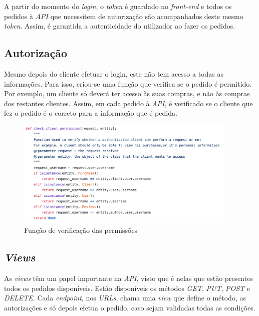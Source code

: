 \documentclass[10pt,english]{article}
\begin{document}
\par A partir do momento do \textit{login}, o \textit{token} é guardado no \textit{front-end} e todos os pedidos à \textit{API} que necessitem de autorização são acompanhados deste mesmo \textit{token}. Assim, é garantida a autenticidade do utilizador ao fazer os pedidos.

\subsection{Autorização}

\par Mesmo depois do cliente efetuar o login, este não tem acesso a todas as informações. Para isso, criou-se uma função que verifica se o pedido é permitido. Por exemplo, um cliente só deverá ter acesso às suas compras, e não às compras dos restantes clientes. Assim, em cada pedido à \textit{API}, é verificado se o cliente que fez o pedido é o correto para a informação que é pedida. 

\begin{figure}[!h]
        \centering
        \includegraphics[width=400]{images/clientverif.png}
        \caption{Função de verificação das permissões}
\end{figure}

\newpage

\subsection{\textit{Views}}

\par As \textit{views} têm um papel importante na \textit{API}, visto que é nelas que estão presentes todos os pedidos disponíveis. Estão disponíveis os métodos \textit{GET}, \textit{PUT}, \textit{POST} e \textit{DELETE}. Cada \textit{endpoint}, nos \textit{URLs}, chama uma \textit{view} que define o método, as autorizações e só depois efetua o pedido, caso sejam validadas todas as condições.
\end{document}
